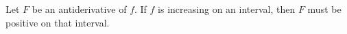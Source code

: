 \documentclass{ximera}
\author{Steven Gubkin}
\begin{document}
\begin{exercise}



Let $F$ be an antiderivative of $f$.  If $f$ is increasing on an interval, then $F$ must be positive on that interval.

	\begin{multipleChoice}	
	\end{multipleChoice}

\end{exercise}
\end{document}

